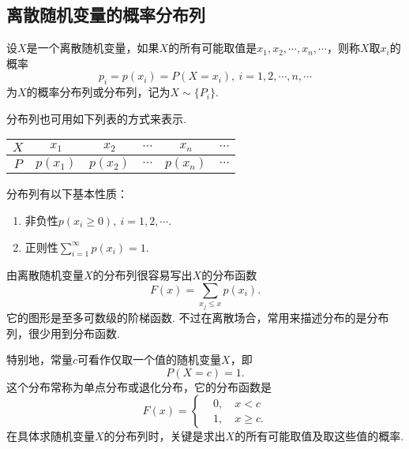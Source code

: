 \documentclass[lang=cn,10pt]{elegantbook}
\begin{document}
\subsection{离散随机变量的概率分布列}
\begin{definition}[概率分布列]
	设$X$是一个离散随机变量，如果$X$的所有可能取值是$x_1,x_2,\cdots,x_n,\cdots$，则称$X$取$x_i$的概率
	$$p_i=p(x_i)=P(X=x_i),\ i=1,2,\cdots,n,\cdots$$
	为$X$的{\heiti 概率分布列}或{\heiti 分布列}，记为$X\sim \{P_i\}$.
\end{definition}
分布列也可用如下列表的方式来表示.

\begin{tabular}{c|ccccc}
	$X$ & $x_1$ & $x_2$ & $\cdots$ & $x_n$ & $\cdots$\\
	\hline
	$P$ & $p(x_1)$ & $p(x_2)$ & $\cdots$ & $p(x_n)$ & $\cdots$\\
\end{tabular}

\begin{theorem}
	分布列有以下基本性质：
	\begin{enumerate}[(1)]
		\item {\heiti 非负性}\quad $p(x_i\geqslant 0),\ i=1,2,\cdots.$
		\item {\heiti 正则性}\quad $\displaystyle\sum_{i=1}^{\infty}p(x_i)=1$.
	\end{enumerate}
\end{theorem}
由离散随机变量$X$的分布列很容易写出$X$的分布函数
$$F(x)=\sum_{x_j\leqslant x}p(x_i).$$
它的图形是至多可数级的阶梯函数. 不过在离散场合，常用来描述分布的是分布列，很少用到分布函数.

特别地，常量$c$可看作仅取一个值的随机变量$X$，即
$$P(X=c)=1.$$
这个分布常称为{\heiti 单点分布}或{\heiti 退化分布}，它的分布函数是
\begin{equation*}
	F(x)=
	\left\{
	\begin{aligned}
		&0,\quad x<c\\
		&1,\quad x\geqslant c.
	\end{aligned}
	\right.
\end{equation*}
在具体求随机变量$X$的分布列时，关键是求出$X$的所有可能取值及取这些值的概率.
\end{document}
